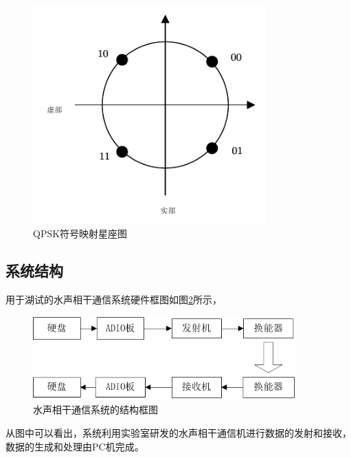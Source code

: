 \begin{figure}[htb]
  \begin{center}
    \includegraphics[width=0.8\textwidth]{images/qpsk.pdf}
  \end{center}
  \caption{QPSK符号映射星座图}
  \label{fig:6.1}
\end{figure}
\subsection{系统结构}
用于湖试的水声相干通信系统硬件框图如图\ref{fig:6.2}所示，
\begin{figure}[htb]
  \begin{center}
    \includegraphics[width=0.9\textwidth]{images/block.pdf}
  \end{center}
  \caption{水声相干通信系统的结构框图}
  \label{fig:6.2}
\end{figure}
从图中可以看出，系统利用实验室研发的水声相干通信机进行数据的发射和接收，数据的生成和处理由PC机完成。

